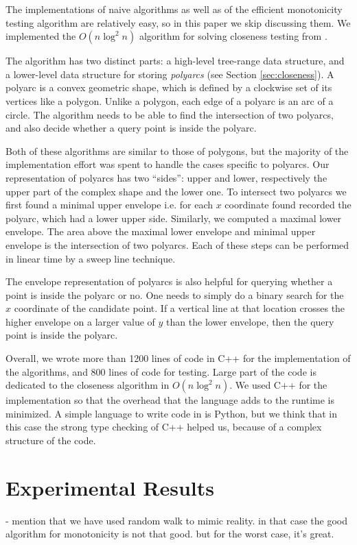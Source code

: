 \documentclass{article}
\begin{document}
The implementations of naive algorithms as well as of the efficient monotonicity testing algorithm are relatively easy, so in this paper we skip discussing them. We implemented the $O(n \log ^2 n)$ algorithm for solving closeness testing from \cite{chan2016}.

The algorithm has two distinct parts: a high-level tree-range data structure, and a lower-level data structure for storing \textit{polyarcs} (see Section \ref{sec:closeness}). A polyarc is a convex geometric shape, which is defined by a clockwise set of its vertices like a polygon. Unlike a polygon, each edge of a polyarc is an arc of a circle. The algorithm needs to be able to find the intersection of two polyarcs, and also decide whether a query point is inside the polyarc.

Both of these algorithms are similar to those of polygons, but the majority of the implementation effort was spent to handle the cases specific to polyarcs. Our representation of polyarcs has two ``sides'': upper and lower, respectively the upper part of the complex shape and the lower one. To intersect two polyarcs we first found a minimal upper envelope i.e. for each $x$ coordinate found recorded the polyarc, which had a lower upper side. Similarly, we computed a maximal lower envelope. The area above the maximal lower envelope and minimal upper envelope is the intersection of two polyarcs. Each of these steps can be performed in linear time by a sweep line technique.

The envelope representation of polyarcs is also helpful for querying whether a point is inside the polyarc or no. One needs to simply do a binary search for the $x$ coordinate of the candidate point.
If a vertical line at that location crosses the higher envelope on a larger value of $y$ than the lower envelope, then the query point is inside the polyarc.

Overall, we wrote more than 1200 lines of code in C++ for the implementation of the algorithms, and 800 lines of code for testing. Large part of the code is dedicated to the closeness algorithm in $O(n \log^2 n)$. We used C++ for the implementation so that the overhead that the language adds to the runtime is minimized. A simple language to write code in is Python, but we think that in this case the strong type checking of C++ helped us, because of a complex structure of the code. 

\section{Experimental Results}
\label{sec:experiments}
- mention that we have used random walk to mimic reality. in that case the good algorithm for monotonicity is not that good. but for the worst case, it's great.
\end{document}
